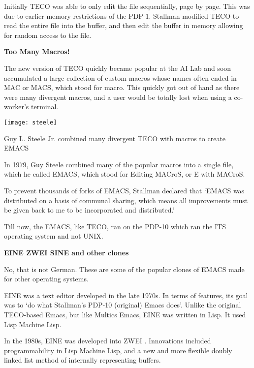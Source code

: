 Initially TECO was able to only edit the file
sequentially, page by page. This was due to earlier
memory restrictions of the PDP-1.
Stallman modified TECO to read the entire file into
the buffer, and then edit the buffer in memory
allowing for random access to the file.

\textbf{Too Many Macros!}

The new version of TECO quickly became popular at
the AI Lab and soon accumulated a large collection
of custom macros whose names often ended in MAC or
MACS, which stood for macro.
This quickly got out of hand as there were many
divergent macros, and a user would be totally
lost when using a co-worker's terminal.

\begin{marginfigure}
  \texttt{[image: steele]}
  \caption{Guy L. Steele Jr. combined many divergent TECO with macros to create EMACS}
\end{marginfigure}


In 1979, Guy Steele combined many of the popular
macros into a single file, which he called EMACS,
which stood for Editing MACroS, or E with MACroS.

To prevent thousands of forks of EMACS, Stallman
declared that
`EMACS was distributed on a basis of communal sharing,
which means all improvements must be given back to me
to be incorporated and distributed.'

Till now, the EMACS, like TECO, ran on the PDP-10
which ran the ITS operating system and not UNIX.

\textbf{EINE ZWEI SINE and other clones}

No, that is not German.
These are some of the popular clones of EMACS
made for other operating systems.

EINE
was a text editor developed in the late 1970s.
In terms of features, its goal was to `do what Stallman's
PDP-10 (original) Emacs does'.
Unlike the original TECO-based Emacs, but like Multics Emacs,
EINE was written in Lisp. It used Lisp Machine Lisp.

In the 1980s, EINE was developed into ZWEI
.
Innovations included programmability in Lisp Machine Lisp,
and a new and more flexible doubly linked
list method of internally representing buffers.


